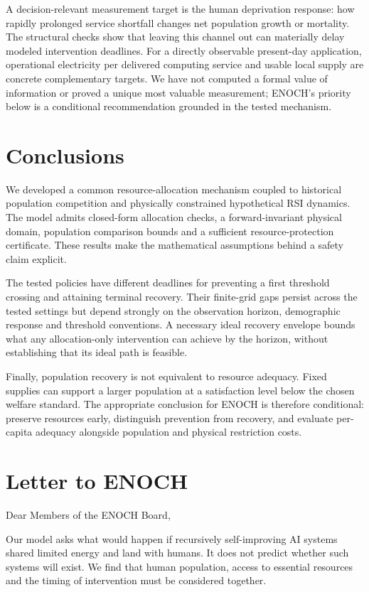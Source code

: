 \documentclass[12pt,a4paper]{article}
\theoremstyle{remark}
\begin{document}
A decision-relevant measurement target is the human deprivation response: how rapidly prolonged service shortfall changes net population growth or mortality. The structural checks show that leaving this channel out can materially delay modeled intervention deadlines. For a directly observable present-day application, operational electricity per delivered computing service and usable local supply are concrete complementary targets. We have not computed a formal value of information or proved a unique most valuable measurement; ENOCH's priority below is a conditional recommendation grounded in the tested mechanism.

\section{Conclusions}\label{sec:conclusions}
We developed a common resource-allocation mechanism coupled to historical population competition and physically constrained hypothetical RSI dynamics. The model admits closed-form allocation checks, a forward-invariant physical domain, population comparison bounds and a sufficient resource-protection certificate. These results make the mathematical assumptions behind a safety claim explicit.

The tested policies have different deadlines for preventing a first threshold crossing and attaining terminal recovery. Their finite-grid gaps persist across the tested settings but depend strongly on the observation horizon, demographic response and threshold conventions. A necessary ideal recovery envelope bounds what any allocation-only intervention can achieve by the horizon, without establishing that its ideal path is feasible.

Finally, population recovery is not equivalent to resource adequacy. Fixed supplies can support a larger population at a satisfaction level below the chosen welfare standard. The appropriate conclusion for ENOCH is therefore conditional: preserve resources early, distinguish prevention from recovery, and evaluate per-capita adequacy alongside population and physical restriction costs.

\FloatBarrier
\clearpage
\section*{Letter to ENOCH}
\noindent Dear Members of the ENOCH Board,

Our model asks what would happen if recursively self-improving AI systems shared limited energy and land with humans. It does not predict whether such systems will exist. We find that human population, access to essential resources and the timing of intervention must be considered together.
\end{document}
